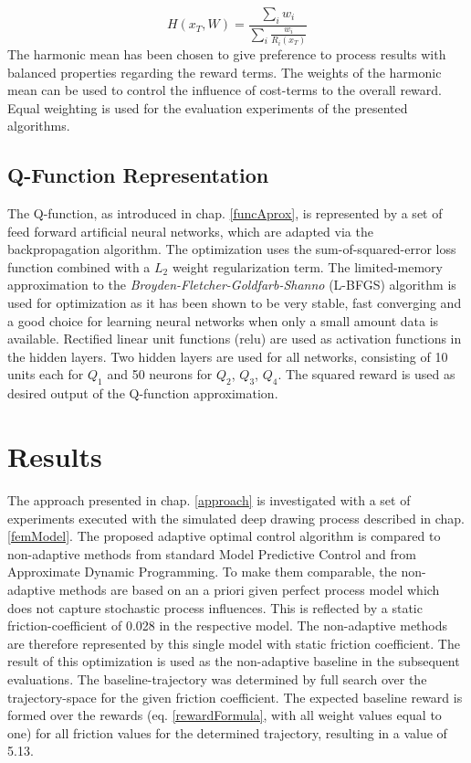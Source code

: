 \begin{equation}
H(x_T, W)=\frac{\sum_i w_i}{\sum_i \frac{w_i}{R_i(x_T)}}
\end{equation}
The harmonic mean has been chosen to give preference to process results with balanced properties regarding the reward terms. The weights of the harmonic mean can be used to control the influence of cost-terms to the overall reward. Equal weighting is used for the evaluation experiments of the presented algorithms.

\subsection{Q-Function Representation}
\label{q_func_representation}
The Q-function, as introduced in chap. \ref{funcAprox}, is represented by a set of feed forward artificial neural networks, which are adapted via the backpropagation algorithm. The optimization uses the sum-of-squared-error loss function combined with a $L_2$ weight regularization term. 
The limited-memory approximation to the \textit{Broyden-Fletcher-Goldfarb-Shanno} (L-BFGS) algorithm \cite{liu1989limited} is used for optimization as it has been shown to be very stable, fast converging and a good choice for learning neural networks when only a small amount data is available. Rectified linear unit functions (relu) are used as activation functions in the hidden layers. Two hidden layers are used for all networks, consisting of 10 units each for $Q_1$ and 50 neurons for $Q_2$, $Q_3$, $Q_4$. The squared reward is used as desired output of the Q-function approximation.

\section{Results}
\label{results}
The approach presented in chap. \ref{approach} is investigated with a set of experiments executed with the simulated deep drawing process described in chap. \ref{femModel}. The proposed adaptive optimal control algorithm is compared to non-adaptive methods from standard Model Predictive Control and from Approximate Dynamic Programming. To make them comparable, the non-adaptive methods are based on an a priori given perfect process model which does not capture stochastic process influences. This is reflected by a static friction-coefficient of 0.028 in the respective model. The non-adaptive methods are therefore represented by this single model with static friction coefficient. The result of this optimization is used as the non-adaptive baseline in the subsequent evaluations. The baseline-trajectory was determined by full search over the trajectory-space for the given friction coefficient. The expected baseline reward is formed over the rewards (eq. \ref{rewardFormula}, with all weight values equal to one) for all friction values for the determined trajectory, resulting in a value of 5.13.

